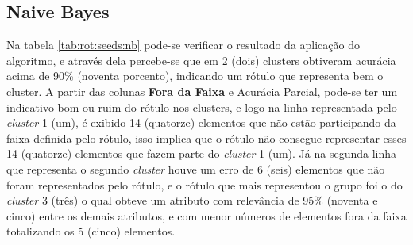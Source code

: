 

\subsection{Naive Bayes} \label{cap:resultados:ssec:seed:nb}



Na tabela \ref{tab:rot:seeds:nb} pode-se verificar o resultado da aplicação do algoritmo, e através dela percebe-se que em 2 (dois) clusters obtiveram acurácia acima de 90\% (noventa porcento), indicando um rótulo que representa bem o cluster. A partir das colunas  \textbf{Fora da Faixa} e Acurácia Parcial, pode-se ter um indicativo bom ou ruim do rótulo nos clusters, e  logo na linha representada pelo \textit{cluster} 1 (um), é exibido 14 (quatorze) elementos que não estão participando da faixa definida pelo rótulo, isso implica que o rótulo não consegue representar esses 14 (quatorze) elementos que fazem parte do \textit{cluster} 1 (um). Já na segunda linha que representa o segundo \textit{cluster} houve um erro de 6 (seis) elementos que não foram representados pelo rótulo, e o rótulo que mais representou o grupo foi o do \textit{cluster} 3 (três) o qual obteve um atributo com relevância de 95\% (noventa e cinco) entre os demais atributos, e com menor números de elementos fora da faixa totalizando os 5 (cinco) elementos. %


